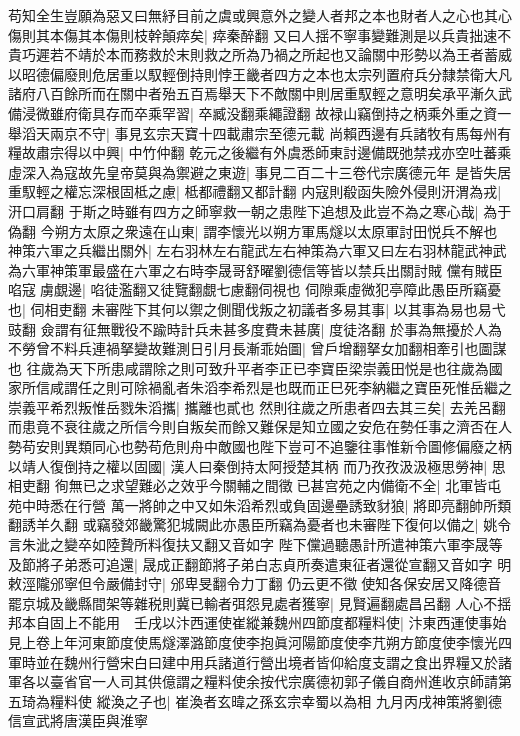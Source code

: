 苟知全生豈願為惡又曰無紓目前之虞或興意外之變人者邦之本也財者人之心也其心傷則其本傷其本傷則枝幹顛瘁矣|{
	瘁秦醉翻}
又曰人揺不寧事變難測是以兵貴拙速不貴巧遲若不靖於本而務救於末則救之所為乃禍之所起也又論關中形勢以為王者蓄威以昭德偏廢則危居重以馭輕倒持則悖王畿者四方之本也太宗列置府兵分隸禁衛大凡諸府八百餘所而在關中者殆五百焉舉天下不敵關中則居重馭輕之意明矣承平漸久武備浸微雖府衛具存而卒乘罕習|{
	卒臧没翻乘繩證翻}
故禄山竊倒持之柄乘外重之資一舉滔天兩京不守|{
	事見玄宗天寶十四載肅宗至德元載}
尚賴西邊有兵諸牧有馬每州有糧故肅宗得以中興|{
	中竹仲翻}
乾元之後繼有外虞悉師東討邊備既弛禁戎亦空吐蕃乘虛深入為寇故先皇帝莫與為禦避之東遊|{
	事見二百二十三卷代宗廣德元年}
是皆失居重馭輕之權忘深根固柢之慮|{
	柢都禮翻又都計翻}
内寇則殽函失險外侵則汧渭為戎|{
	汧口肩翻}
于斯之時雖有四方之師寧救一朝之患陛下追想及此豈不為之寒心哉|{
	為于偽翻}
今朔方太原之衆遠在山東|{
	謂李懷光以朔方軍馬燧以太原軍討田悦兵不解也}
神策六軍之兵繼出關外|{
	左右羽林左右龍武左右神策為六軍又曰左右羽林龍武神武為六軍神策軍最盛在六軍之右時李晟哥舒曜劉德信等皆以禁兵出關討賊}
儻有賊臣啗寇虜覷邊|{
	啗徒濫翻又徒覽翻覷七慮翻伺視也}
伺隙乘虛微犯亭障此愚臣所竊憂也|{
	伺相吏翻}
未審陛下其何以禦之側聞伐叛之初議者多易其事|{
	以其事為易也易弋豉翻}
僉謂有征無戰役不踰時計兵未甚多度費未甚廣|{
	度徒洛翻}
於事為無擾於人為不勞曾不料兵連禍拏變故難測日引月長漸乖始圖|{
	曾戶增翻拏女加翻相牽引也圖謀也}
往歲為天下所患咸謂除之則可致升平者李正已李寶臣梁崇義田悦是也往歲為國家所信咸謂任之則可除禍亂者朱滔李希烈是也既而正巳死李納繼之寶臣死惟岳繼之崇義平希烈叛惟岳戮朱滔攜|{
	攜離也貳也}
然則往歲之所患者四去其三矣|{
	去羌呂翻}
而患竟不衰往歲之所信今則自叛矣而餘又難保是知立國之安危在勢任事之濟否在人勢苟安則異類同心也勢苟危則舟中敵國也陛下豈可不追鑒往事惟新令圖修偏廢之柄以靖人復倒持之權以固國|{
	漢人曰秦倒持太阿授楚其柄}
而乃孜孜汲汲極思勞神|{
	思相吏翻}
徇無已之求望難必之效乎今關輔之間徵已甚宫苑之内備衛不全|{
	北軍皆屯苑中時悉在行營}
萬一將帥之中又如朱滔希烈或負固邊壘誘致豺狼|{
	將即亮翻帥所類翻誘羊久翻}
或竊發郊畿驚犯城闕此亦愚臣所竊為憂者也未審陛下復何以備之|{
	姚令言朱泚之變卒如陸贄所料復扶又翻又音如字}
陛下儻過聽愚計所遣神策六軍李晟等及節將子弟悉可追還|{
	晟成正翻節將子弟白志貞所奏遣東征者還從宣翻又音如字}
明敕涇隴邠寧但令嚴備封守|{
	邠卑旻翻令力丁翻}
仍云更不徵使知各保安居又降德音罷京城及畿縣間架等雜税則冀已輸者弭怨見處者獲寧|{
	見賢遍翻處昌呂翻}
人心不揺邦本自固上不能用　壬戌以汴西運使崔縱兼魏州四節度都糧料使|{
	汴東西運使事始見上卷上年河東節度使馬燧澤潞節度使李抱眞河陽節度使李芁朔方節度使李懷光四軍時並在魏州行營宋白曰建中用兵諸道行營出境者皆仰給度支謂之食出界糧又於諸軍各以臺省官一人司其供億謂之糧料使余按代宗廣德初郭子儀自商州進收京師請第五琦為糧料使}
縱渙之子也|{
	崔渙者玄暐之孫玄宗幸蜀以為相}
九月丙戌神策將劉德信宣武將唐漢臣與淮寧


